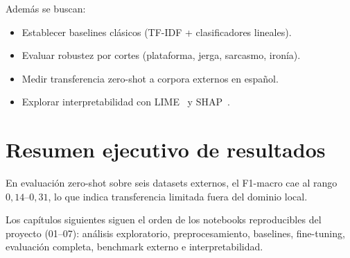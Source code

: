 Además se buscan:
\begin{itemize}[leftmargin=*]
  \item Establecer baselines clásicos (TF-IDF + clasificadores lineales).
  \item Evaluar robustez por cortes (plataforma, jerga, sarcasmo, ironía).
  \item Medir transferencia zero-shot a corpora externos en español.
  \item Explorar interpretabilidad con LIME~\cite{ribeiro2016lime} y
        SHAP~\cite{lundberg2017shap}.
\end{itemize}

\section{Resumen ejecutivo de resultados}



En evaluación zero-shot sobre seis datasets externos, el F1-macro cae al rango
$0{,}14$--$0{,}31$, lo que indica transferencia limitada fuera del dominio local.


Los capítulos siguientes siguen el orden de los notebooks reproducibles del
proyecto (01--07): análisis exploratorio, preprocesamiento, baselines, fine-tuning,
evaluación completa, benchmark externo e interpretabilidad.
